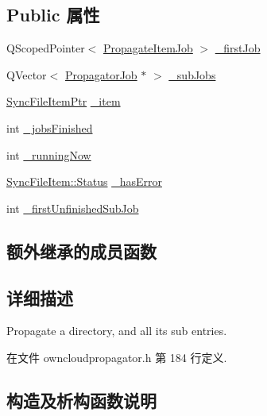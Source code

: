 \subsection*{Public 属性}
\begin{DoxyCompactItemize}
\item 
Q\+Scoped\+Pointer$<$ \hyperlink{class_o_c_c_1_1_propagate_item_job}{Propagate\+Item\+Job} $>$ \hyperlink{class_o_c_c_1_1_propagate_directory_a271599490f7f9e44d871a083a6cca3a7}{\+\_\+first\+Job}
\item 
Q\+Vector$<$ \hyperlink{class_o_c_c_1_1_propagator_job}{Propagator\+Job} $\ast$ $>$ \hyperlink{class_o_c_c_1_1_propagate_directory_a66a9b54963f22dae1093fcaa4329f6fb}{\+\_\+sub\+Jobs}
\item 
\hyperlink{namespace_o_c_c_acb6b0db82893659fbd0c98d3c5b8e2b8}{Sync\+File\+Item\+Ptr} \hyperlink{class_o_c_c_1_1_propagate_directory_aef698b8b80ebcc3c65b2bb79f9d0b05b}{\+\_\+item}
\item 
int \hyperlink{class_o_c_c_1_1_propagate_directory_a255761b9c7a077df20b576b5d64c6472}{\+\_\+jobs\+Finished}
\item 
int \hyperlink{class_o_c_c_1_1_propagate_directory_ae7ead403fb820b3c05d8327c5f8206eb}{\+\_\+running\+Now}
\item 
\hyperlink{class_o_c_c_1_1_sync_file_item_a149ade86eddd9661587bfbc9bcbca408}{Sync\+File\+Item\+::\+Status} \hyperlink{class_o_c_c_1_1_propagate_directory_a2aeb7f7834c960ead4f4a0836b88d55f}{\+\_\+has\+Error}
\item 
int \hyperlink{class_o_c_c_1_1_propagate_directory_aac902be6d43bd8fc18606168f9c4eb93}{\+\_\+first\+Unfinished\+Sub\+Job}
\end{DoxyCompactItemize}
\subsection*{额外继承的成员函数}


\subsection{详细描述}
Propagate a directory, and all its sub entries. 

在文件 owncloudpropagator.\+h 第 184 行定义.



\subsection{构造及析构函数说明}
\mbox{\label{class_o_c_c_1_1_propagate_directory_a3f78598b8a214007c308bc20f857a69f}} 
